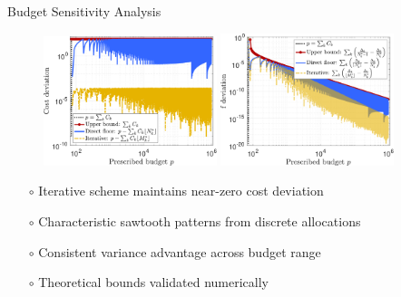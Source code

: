 \documentclass{beamer}
\begin{document}
\begin{frame}{Budget Sensitivity Analysis}
\begin{figure}
\centering
\includegraphics[width=0.45\textwidth]{./Figures/Eg1_Cost.pdf}
\includegraphics[width=0.45\textwidth]{./Figures/Eg1_f.pdf}
\end{figure}

{\footnotesize
\begin{itemize}[leftmargin=15pt] 
\item[$\circ$] Iterative scheme maintains near-zero cost deviation
\item[$\circ$] Characteristic sawtooth patterns from discrete allocations
\item[$\circ$] Consistent variance advantage across budget range
\item[$\circ$] Theoretical bounds validated numerically
\end{itemize}
}
\end{frame}
\end{document}
